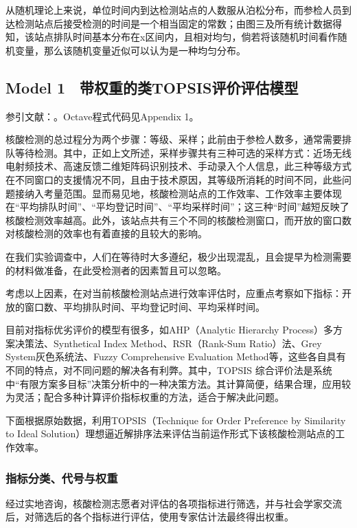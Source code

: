 \documentclass[
  journal=,
  manuscript=,
  year=2022,
  volume=01,
]{cup-journal}
\begin{document}
\par 从随机理论上来说，单位时间内到达检测站点的人数服从泊松分布，而参检人员到达检测站点后接受检测的时间是一个相当固定的常数；由图三及所有统计数据得知，该站点排队时间基本分布在x区间内，且相对均匀，倘若将该随机时间看作随机变量，那么该随机变量近似可以认为是一种均匀分布。

\subsection{Model 1　带权重的类TOPSIS评价评估模型}
\noindent 参引文献：\cite{chakraborty2022topsis}。Octave程式代码见Appendix 1。
\par 核酸检测的总过程分为两个步骤：等级、采样；此前由于参检人数多，通常需要排队等待检测。其中，正如上文所述，采样步骤共有三种可选的采样方式：近场无线电射频技术、高速反馈二维矩阵码识别技术、手动录入个人信息，此三种等级方式在不同窗口的支援情况不同，且由于技术原因，其等级所消耗的时间不同，此些问题接纳入考量范围。显而易见地，核酸检测站点的工作效率、工作效率主要体现在“平均排队时间”、“平均登记时间”、“平均采样时间”；这三种“时间”越短反映了核酸检测效率越高。此外，该站点共有三个不同的核酸检测窗口，而开放的窗口数对核酸检测的效率也有着直接的且较大的影响。
\par 在我们实验调查中，人们在等待时大多遵纪，极少出现混乱，且会提早为检测需要的材料做准备，在此受检测者的因素暂且可以忽略。
\par 考虑以上因素，在对当前核酸检测站点进行效率评估时，应重点考察如下指标：开放的窗口数、平均排队时间、平均登记时间、平均采样时间。
\par 目前对指标优劣评价的模型有很多，如AHP（Analytic Hierarchy Process）多方案决策法、Synthetical Index Method、RSR（Rank-Sum Ratio）法、Grey System灰色系统法、Fuzzy Comprehensive Evaluation Method等，这些各自具有不同的特点，对不同问题的解决各有利弊。其中，TOPSIS 综合评价法是系统中“有限方案多目标”决策分析中的一种决策方法。其计算简便，结果合理，应用较为灵活；配合多种计算评价指标权重的方法，适合于解决此问题。
\par 下面根据原始数据，利用TOPSIS（Technique for Order Preference by Similarity to Ideal Solution）理想逼近解排序法来评估当前运作形式下该核酸检测站点的工作效率。

\subsubsection{指标分类、代号与权重}

\par 经过实地咨询，核酸检测志愿者对评估的各项指标进行筛选，并与社会学家交流后，对筛选后的各个指标进行评估，使用专家估计法最终得出权重。
\end{document}
